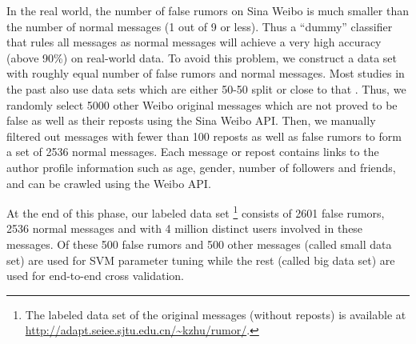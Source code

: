 In the real world, the number of false rumors on Sina Weibo
is much smaller than the number of normal messages (1 out of 9 or less).
Thus a ``dummy'' classifier that rules all messages as normal messages
will achieve a very high accuracy (above 90\%) on real-world data.
To avoid this problem, we construct a data set with roughly equal number of
false rumors and normal messages. Most studies in the past also use
data sets which are either 50-50 split
\cite{castillo2011information,jin2013epidemiological}
or close to that \cite{yang2012automatic,qazvinian2011rumor}.
Thus, we randomly select 5000 other Weibo original messages
which are not proved to be false as well as their reposts
using the Sina Weibo API. Then, we manually filtered out messages with fewer than 100 reposts as well as false rumors to form a set of 2536 normal messages.
Each message or repost contains links to the author profile
information such as age, gender, number of followers and friends,
and can be crawled using the Weibo API.
%
%

At the end of this phase, our labeled data set 
\footnote{The labeled data set of the original messages (without reposts)
is available at \url{http://adapt.seiee.sjtu.edu.cn/~kzhu/rumor/}.}
consists of 2601 false rumors, 2536 normal messages
and with 4 million distinct users involved in these messages. Of these
500 false rumors and 500 other messages (called small data set) are used for
SVM parameter tuning while
the rest (called big data set) are used for end-to-end cross validation.
